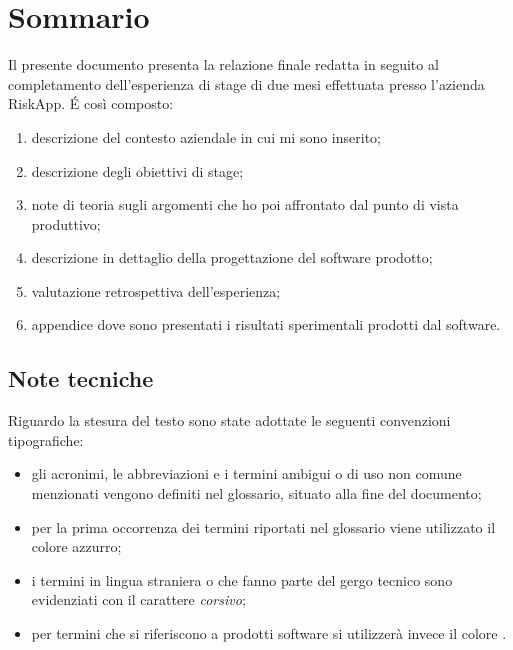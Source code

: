 
\cleardoublepage
{}
{}
\begingroup
\let\clearpage\relax
\let\cleardoublepage\relax
\let\cleardoublepage\relax

\chapter*{Sommario}
Il presente documento presenta la relazione finale redatta in seguito al completamento dell'esperienza di stage di due mesi effettuata presso l'azienda RiskApp.
\'E così composto:
\begin{enumerate}
    \item descrizione del contesto aziendale in cui mi sono inserito;
    \item descrizione degli obiettivi di stage;
    \item note di teoria sugli argomenti che ho poi affrontato dal punto di vista produttivo;
    \item descrizione in dettaglio della progettazione del software prodotto;
    \item valutazione retrospettiva dell'esperienza;
    \item appendice dove sono presentati i risultati sperimentali prodotti dal software.
\end{enumerate}

\section*{Note tecniche}
Riguardo la stesura del testo sono state adottate le seguenti convenzioni tipografiche:
\begin{itemize}
    \item gli acronimi, le abbreviazioni e i termini ambigui o di uso non comune menzionati vengono definiti nel glossario, situato alla fine del documento;
    \item per la prima occorrenza dei termini riportati nel glossario viene utilizzato il colore azzurro;
    \item i termini in lingua straniera o che fanno parte del gergo tecnico sono evidenziati con il carattere \emph{corsivo};
    \item per termini che si riferiscono a prodotti software si utilizzerà invece il colore .
\end{itemize}


%
%

\endgroup			

\vfill

